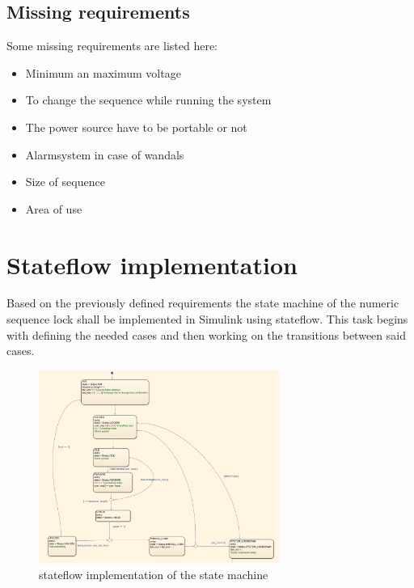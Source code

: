 	\subsection{Missing requirements}\label{subsec:missing}
	Some missing requirements are listed here:
	\begin{itemize}
		\item Minimum an maximum voltage
		\item To change the sequence while running the system
		\item The power source have to be portable or not
		\item Alarmsystem in case of wandals
		\item Size of sequence
		\item Area of use
	\end{itemize}

	\section{Stateflow implementation}
	Based on the previously defined requirements the state machine of the numeric sequence lock shall be implemented in Simulink using stateflow. This task begins with defining the needed cases and then working on the transitions between said cases.
		\begin{figure}[H]
				\centering
				\includegraphics[width=0.7\textwidth]{figures/stateflow.png}
				\caption{stateflow implementation of the state machine}
				\label{fig:state}
		\end{figure} 

